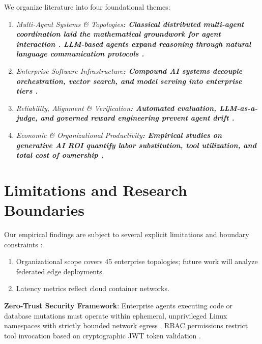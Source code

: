 \documentclass[10pt,twocolumn,letterpaper]{article}
\begin{document}
We organize literature into four foundational themes:
\begin{enumerate}
  \item \textit{Multi-Agent Systems \& Topologies\textbf{: Classical distributed multi-agent coordination laid the mathematical groundwork for agent interaction \cite{arxiv_2203_08975,arxiv_2010_11146}. LLM-based agents expand reasoning through natural language communication protocols \cite{arxiv_2005_14165,arxiv_2412_06333}.}}
  \item \textit{Enterprise Software Infrastructure\textbf{: Compound AI systems decouple orchestration, vector search, and model serving into enterprise tiers \cite{arxiv_2406_00584,crossref_10_1109_access_2026_3656309}.}}
  \item \textit{Reliability, Alignment \& Verification\textbf{: Automated evaluation, LLM-as-a-judge, and governed reward engineering prevent agent drift \cite{arxiv_2411_15594,arxiv_2404_01131,arxiv_2302_10809}.}}
  \item \textit{Economic \& Organizational Productivity\textbf{: Empirical studies on generative AI ROI quantify labor substitution, tool utilization, and total cost of ownership \cite{crossref_10_1201_9788743808145_14,crossref_10_1108_jeim_12_2025_1269,arxiv_2405_01543}.}}
\end{enumerate}




\section{Limitations and Research Boundaries}

Our empirical findings are subject to several explicit limitations and boundary constraints \cite{crossref_10_1201_9788743808145_14}:
\begin{enumerate}
  \item Organizational scope covers 45 enterprise topologies; future work will analyze federated edge deployments.
  \item Latency metrics reflect cloud container networks.
\end{enumerate}

\textbf{Zero-Trust Security Framework}: Enterprise agents executing code or database mutations must operate within ephemeral, unprivileged Linux namespaces with strictly bounded network egress \cite{arxiv_2404_04289,doaj_001772c2113c476d9d5d40452c8e10e1}. RBAC permissions restrict tool invocation based on cryptographic JWT token validation \cite{pubmed_42380865}.
\end{document}
